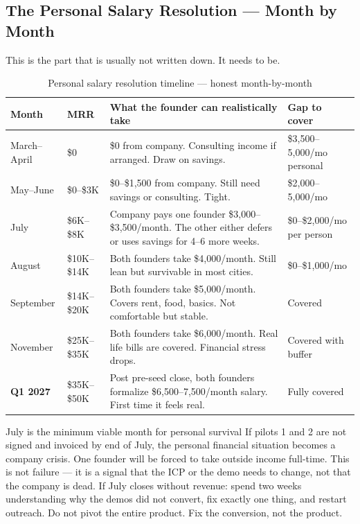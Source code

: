 \subsection*{The Personal Salary Resolution --- Month by Month}

This is the part that is usually not written down. It needs to be.

\begin{table}[H]
\centering
\renewcommand{\arraystretch}{1.6}
\begin{tabularx}{\textwidth}{@{}llXl@{}}
\toprule
\textbf{Month} & \textbf{MRR} & \textbf{What the founder can realistically take} &
\textbf{Gap to cover} \\
\midrule
March--April & \$0 & \$0 from company. Consulting income if arranged.
  Draw on savings. & \$3,500--5,000/mo personal \\
May--June & \$0--\$3K & \$0--\$1,500 from company. Still need
  savings or consulting. Tight. & \$2,000--5,000/mo \\
July & \$6K--\$8K & Company pays one founder \$3,000--\$3,500/month.
  The other either defers or uses savings for 4--6 more weeks. &
  \$0--\$2,000/mo per person \\
August & \$10K--\$14K & Both founders take \$4,000/month. Still lean
  but survivable in most cities. & \$0--\$1,000/mo \\
September & \$14K--\$20K & Both founders take \$5,000/month. Covers
  rent, food, basics. Not comfortable but stable. & Covered \\
November & \$25K--\$35K & Both founders take \$6,000/month. Real life
  bills are covered. Financial stress drops. & Covered with buffer \\
\midrule
\textbf{Q1 2027} & \$35K--\$50K & Post pre-seed close, both founders
  formalize \$6,500--7,500/month salary. First time it feels real. &
  Fully covered \\
\bottomrule
\end{tabularx}
\caption{Personal salary resolution timeline --- honest month-by-month}
\end{table}

\begin{warnbox}{July is the minimum viable month for personal survival}
If pilots 1 and 2 are not signed and invoiced by end of July, the
personal financial situation becomes a company crisis. One founder will
be forced to take outside income full-time. This is not failure --- it
is a signal that the ICP or the demo needs to change, not that the
company is dead. If July closes without revenue: spend two weeks
understanding why the demos did not convert, fix exactly one thing, and
restart outreach. Do not pivot the entire product. Fix the conversion, not
the product.
\end{warnbox}

